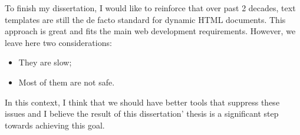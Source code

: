 \noindent
To finish my dissertation, I would like to reinforce that over past 2 decades, text templates are still the de facto standard for dynamic \ac{HTML} documents. This approach is great and fits the main web development requirements. However, we leave here two considerations:

\begin{itemize}
	\item They are slow;
	\item Most of them are not safe.
\end{itemize}

\noindent
In this context, I think that we should have better tools that suppress these issues and I believe the result of this dissertation' thesis is a significant step towards achieving this goal.